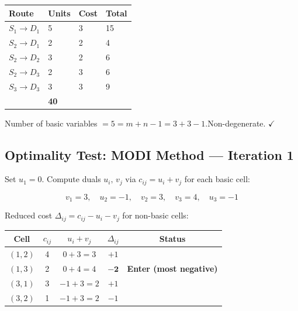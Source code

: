\documentclass[12pt]{article}
\begin{document}
\begin{center}
\renewcommand{\arraystretch}{1.3}
\begin{tabular}{|C{2.6cm}|C{2.2cm}|C{1.8cm}|C{2.4cm}|}
  \hline
  {\color{white}\textbf{Route}} & {\color{white}\textbf{Units}} & {\color{white}\textbf{Cost}} & {\color{white}\textbf{Total}} \\
  \hline
   $S_1 \to D_1$ & 5 & 3 & 15 \\
  \hline
  $S_2 \to D_1$ & 2 & 2 & 4 \\
  \hline
   $S_2 \to D_2$ & 3 & 2 & 6 \\
  \hline
  $S_2 \to D_3$ & 2 & 3 & 6 \\
  \hline
   $S_3 \to D_3$ & 3 & 3 & 9 \\
  \hline
   & \textbf{40} \\
  \hline
\end{tabular}
\end{center}

\vspace{4pt}
Number of basic variables $= 5 = m+n-1 = 3+3-1$.\quad Non-degenerate. $\checkmark$

\vspace{10pt}

\subsection*{Optimality Test: MODI Method --- Iteration 1}

Set $u_1 = 0$. Compute duals $u_i,\,v_j$ via $c_{ij} = u_i + v_j$ for each basic cell:

\[
  v_1=3,\quad u_2=-1,\quad v_2=3,\quad v_3=4,\quad u_3=-1
\]

Reduced cost $\Delta_{ij} = c_{ij} - u_i - v_j$ for non-basic cells:

\begin{center}
\renewcommand{\arraystretch}{1.3}
\begin{tabular}{|c|c|c|c|c|}
  \hline
  \rowcolor{primary}
  {\color{white}\textbf{Cell}} & {\color{white}$c_{ij}$} &
  {\color{white}$u_i+v_j$} & {\color{white}$\Delta_{ij}$} & {\color{white}\textbf{Status}} \\
  \hline
  $(1,2)$ & 4 & $0+3=3$ & $+1$ & \\
  \hline
  \rowcolor{red!15}$(1,3)$ & 2 & $0+4=4$ & $\mathbf{-2}$ & \textbf{Enter (most negative)} \\
  \hline
  $(3,1)$ & 3 & $-1+3=2$ & $+1$ & \\
  \hline
  $(3,2)$ & 1 & $-1+3=2$ & $-1$ & \\
  \hline
\end{tabular}
\end{center}
\end{document}
